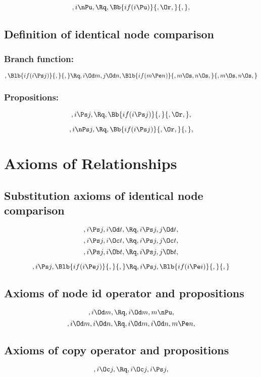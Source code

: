 \[,i \nPu , \Rq ,\Bb{if(i \Pu)}{,\Or,}{,},\]


\bigskip
\bigskip
\bigskip
\bigskip
\subsection{Definition of identical node  comparison}
\subsubsection{Branch function:}
\[, \Blb{if(i \Ps j)}{,}{,} \Rq ,i \Od m ,j \Od n, \Blb{if(m \Pe n)}{,m \Os,n \Os,}{,m \Os,n \Os,}\]
\bigskip
\subsubsection{Propositions:}
\[,i \Ps j , \Rq ,\Bb{if(i \Ps j)}{,}{,\Or,},\]

\[,i \nPs j , \Rq ,\Bb{if(i \Ps j)}{,\Or,}{,},\]

\newpage





\section{Axioms of Relationships}

\subsection{Substitution axioms of identical node  comparison}

\[,i \Ps j, i \Od t, \Rq , i \Ps j, j \Od t,\]
\[,i \Ps j, i \Oc t, \Rq , i \Ps j, j \Oc t,\]
\[,i \Ps j, i \Ob t, \Rq , i \Ps j, j \Ob t,\]
\bigskip
\bigskip

\[,i \Ps j, \Blb{if(i \Pe j)}{,}{,} \Rq , i \Ps j, \Blb{if(i \Pe i)}{,}{,}\]



\bigskip
\bigskip
\bigskip
\bigskip
\subsection{ Axioms of node id operator and propositions}
\[, i \Od m, \Rq , i \Od m,m \nPu,\]
\[, i \Od m, i \Od n, \Rq , i \Od m, i \Od n, m \Pe n,\]

\bigskip
\bigskip
\bigskip
\bigskip
\subsection{ Axioms of copy operator and propositions}
\[, i \Oc j , \Rq , i \Oc j , i \Ps j,\]

